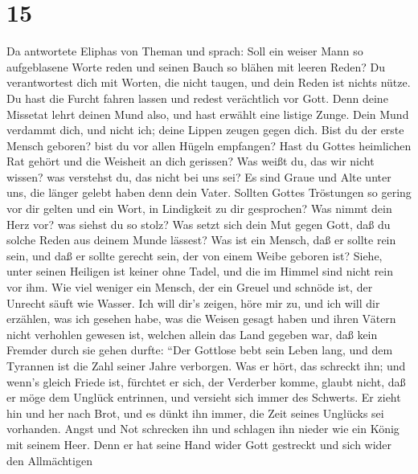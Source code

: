 \hypertarget{section-14}{%
\section{15}\label{section-14}}

 Da antwortete Eliphas von Theman und sprach: 
Soll ein weiser Mann so aufgeblasene Worte reden und seinen Bauch so
blähen mit leeren Reden?  Du verantwortest dich mit Worten,
die nicht taugen, und dein Reden ist nichts nütze.  Du hast
die Furcht fahren lassen und redest verächtlich vor Gott. 
Denn deine Missetat lehrt deinen Mund also, und hast erwählt eine
listige Zunge.  Dein Mund verdammt dich, und nicht ich;
deine Lippen zeugen gegen dich.  Bist du der erste Mensch
geboren? bist du vor allen Hügeln empfangen?  Hast du Gottes
heimlichen Rat gehört und die Weisheit an dich gerissen? 
Was weißt du, das wir nicht wissen? was verstehst du, das nicht bei uns
sei?  Es sind Graue und Alte unter uns, die länger gelebt
haben denn dein Vater.  Sollten Gottes Tröstungen so gering
vor dir gelten und ein Wort, in Lindigkeit zu dir gesprochen?
 Was nimmt dein Herz vor? was siehst du so stolz?
 Was setzt sich dein Mut gegen Gott, daß du solche Reden
aus deinem Munde lässest?  Was ist ein Mensch, daß er
sollte rein sein, und daß er sollte gerecht sein, der von einem Weibe
geboren ist?  Siehe, unter seinen Heiligen ist keiner ohne
Tadel, und die im Himmel sind nicht rein vor ihm.  Wie viel
weniger ein Mensch, der ein Greuel und schnöde ist, der Unrecht säuft
wie Wasser.  Ich will dir's zeigen, höre mir zu, und ich
will dir erzählen, was ich gesehen habe,  was die Weisen
gesagt haben und ihren Vätern nicht verhohlen gewesen ist, 
welchen allein das Land gegeben war, daß kein Fremder durch sie gehen
durfte:  ``Der Gottlose bebt sein Leben lang, und dem
Tyrannen ist die Zahl seiner Jahre verborgen.  Was er hört,
das schreckt ihn; und wenn's gleich Friede ist, fürchtet er sich, der
Verderber komme,  glaubt nicht, daß er möge dem Unglück
entrinnen, und versieht sich immer des Schwerts.  Er zieht
hin und her nach Brot, und es dünkt ihn immer, die Zeit seines Unglücks
sei vorhanden.  Angst und Not schrecken ihn und schlagen
ihn nieder wie ein König mit seinem Heer.  Denn er hat
seine Hand wider Gott gestreckt und sich wider den Allmächtigen
